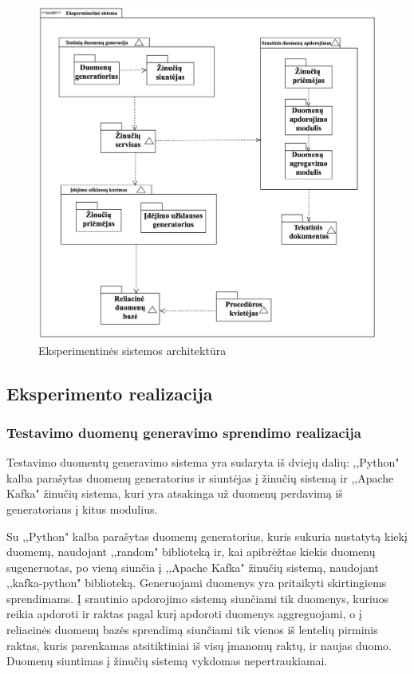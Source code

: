 \documentclass{VUMIFPSkursinis}
\begin{document}
\begin{figure}[!htbp]
    \centering
    \includegraphics[width=1\textwidth]{img/architecture.jpg}
    \caption{Eksperimentinės sistemos architektūra}
    \label{fig:architecture}
\end{figure}
\subsection{Eksperimento realizacija}


\subsubsection{Testavimo duomenų generavimo sprendimo realizacija}

Testavimo duomentų generavimo sistema yra sudaryta iš dviejų dalių: ,,Python" kalba parašytas duomenų generatorius ir siuntėjas į žinučių sistemą ir
,,Apache Kafka" žinučių sistema, kuri yra atsakinga už duomenų perdavimą iš generatoriaus į kitus modulius.\par
Su ,,Python" kalba parašytas duomenų generatorius, kuris sukuria nustatytą kiekį duomenų, naudojant ,,random" biblioteką ir, kai apibrėžtas kiekis duomenų sugeneruotas,
 po vieną siunčia į ,,Apache Kafka" žinučių sistemą, naudojant ,,kafka-python" biblioteką. Generuojami duomenys yra pritaikyti skirtingiems sprendimams.
Į srautinio apdorojimo sistemą siunčiami tik duomenys, kuriuos reikia apdoroti ir raktas pagal kurį apdoroti duomenys aggreguojami, o į reliacinės duomenų
bazės sprendimą siunčiami tik vienos iš lentelių pirminis raktas, kuris parenkamas atsitiktiniai iš visų įmanomų raktų, ir naujas duomo. Duomenų siuntimas į 
žinučių sistemą vykdomas nepertraukiamai.  \par
\end{document}
